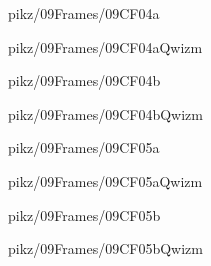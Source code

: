 \documentclass[9pt,xcolor={svgnames, x11names}]{beamer}
\begin{document}

\begin{frame}{pikz/09Frames/09CF04a}
  
\end{frame}


\begin{frame}{pikz/09Frames/09CF04aQwizm}
  
\end{frame}


\begin{frame}{pikz/09Frames/09CF04b}  
  
\end{frame}


\begin{frame}{pikz/09Frames/09CF04bQwizm}  
  
\end{frame}


\begin{frame}{pikz/09Frames/09CF05a}
  
\end{frame}


\begin{frame}{pikz/09Frames/09CF05aQwizm}
  
\end{frame}


\begin{frame}{pikz/09Frames/09CF05b}
  
\end{frame}


\begin{frame}{pikz/09Frames/09CF05bQwizm}
  
\end{frame}
\end{document}
